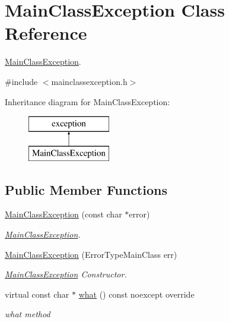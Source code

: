 \hypertarget{class_main_class_exception}{}\section{Main\+Class\+Exception Class Reference}
\label{class_main_class_exception}


\hyperlink{class_main_class_exception}{Main\+Class\+Exception}.  




{\ttfamily \#include $<$mainclassexception.\+h$>$}

Inheritance diagram for Main\+Class\+Exception\+:\begin{figure}[H]
\begin{center}
\leavevmode
\includegraphics[height=2.000000cm]{class_main_class_exception}
\end{center}
\end{figure}
\subsection*{Public Member Functions}
\begin{DoxyCompactItemize}
\item 
\hyperlink{class_main_class_exception_a39be0f0d65c75e63760143fa8559b4b9}{Main\+Class\+Exception} (const char $\ast$error)
\begin{DoxyCompactList}\small\item\em \hyperlink{class_main_class_exception}{Main\+Class\+Exception}. \end{DoxyCompactList}\item 
\hyperlink{class_main_class_exception_a355074a9b4a2dbef92330926da0e67ca}{Main\+Class\+Exception} (Error\+Type\+Main\+Class err)
\begin{DoxyCompactList}\small\item\em \hyperlink{class_main_class_exception}{Main\+Class\+Exception} Constructor. \end{DoxyCompactList}\item 
virtual const char $\ast$ \hyperlink{class_main_class_exception_afb4018ca88fb02af701a0d07e4553d19}{what} () const noexcept override
\begin{DoxyCompactList}\small\item\em what method \end{DoxyCompactList}\end{DoxyCompactItemize}


